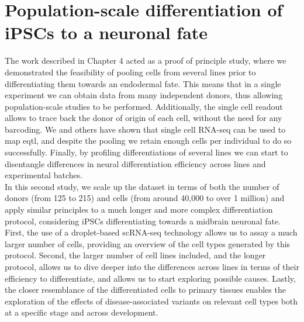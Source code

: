 
\chapter{Population-scale differentiation of iPSCs to a neuronal fate}
\label{chapter5}

The work described in Chapter 
4 acted as a proof of principle study, where we demonstrated the feasibility of pooling cells from several lines prior to differentiating them towards an endodermal fate.
This means that in a single experiment we can obtain data from many independent donors, thus allowing population-scale studies to be performed.
Additionally, the single cell readout allows to trace back the donor of origin of each cell, without the need for any barcoding.
We and others have shown that single cell RNA-seq can be used to map \gls{eqtl}, and despite the pooling we retain enough cells per individual to do so successfully.
Finally, by profiling differentiations of several lines we can start to disentangle differences in neural differentiation efficiency across lines and experimental batches. \\

In this second study, we scale up the dataset in terms of both the number of donors (from 125 to 215) and cells (from around 40,000 to over 1 million) and apply similar principles to a much longer and more complex differentiation protocol, considering iPSCs differentiating towards a midbrain neuronal fate.
First, the use of a droplet-based scRNA-seq technology allows us to assay a much larger number of cells, providing an overview of the 
cell types generated by this protocol. 
Second, the larger number of cell lines included, and the longer protocol, allows us to dive deeper into the differences across lines in terms of their efficiency to differentiate, and allows us to start exploring possible causes.
Lastly, the closer resemblance of the differentiated cells to primary tissues enables the exploration of the effects of disease-associated variants on relevant cell types both at a specific stage and across development. 

